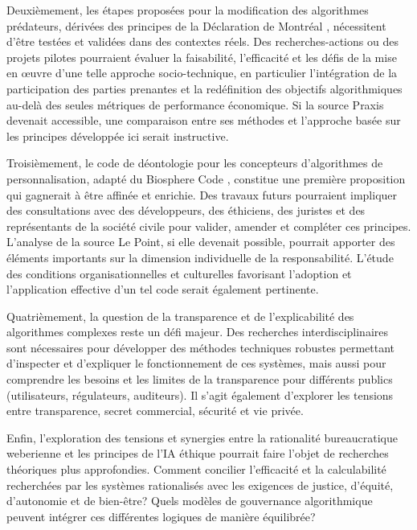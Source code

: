 \documentclass[10pt, twocolumn]{article}
\begin{document}
Deuxièmement, les étapes proposées pour la modification des algorithmes prédateurs, dérivées des principes de la Déclaration de Montréal \citep{Montreal2018}, nécessitent d'être testées et validées dans des contextes réels. Des recherches-actions ou des projets pilotes pourraient évaluer la faisabilité, l'efficacité et les défis de la mise en œuvre d'une telle approche socio-technique, en particulier l'intégration de la participation des parties prenantes et la redéfinition des objectifs algorithmiques au-delà des seules métriques de performance économique. Si la source Praxis devenait accessible, une comparaison entre ses méthodes et l'approche basée sur les principes développée ici serait instructive.

Troisièmement, le code de déontologie pour les concepteurs d'algorithmes de personnalisation, adapté du Biosphere Code \citep{Biosphere2015}, constitue une première proposition qui gagnerait à être affinée et enrichie. Des travaux futurs pourraient impliquer des consultations avec des développeurs, des éthiciens, des juristes et des représentants de la société civile pour valider, amender et compléter ces principes. L'analyse de la source Le Point, si elle devenait possible, pourrait apporter des éléments importants sur la dimension individuelle de la responsabilité. L'étude des conditions organisationnelles et culturelles favorisant l'adoption et l'application effective d'un tel code serait également pertinente.

Quatrièmement, la question de la transparence et de l'explicabilité des algorithmes complexes reste un défi majeur. Des recherches interdisciplinaires sont nécessaires pour développer des méthodes techniques robustes permettant d'inspecter et d'expliquer le fonctionnement de ces systèmes, mais aussi pour comprendre les besoins et les limites de la transparence pour différents publics (utilisateurs, régulateurs, auditeurs). Il s'agit également d'explorer les tensions entre transparence, secret commercial, sécurité et vie privée.

Enfin, l'exploration des tensions et synergies entre la rationalité bureaucratique weberienne \citep{Serpa2019, Weber1922} et les principes de l'IA éthique \citep{Montreal2018} pourrait faire l'objet de recherches théoriques plus approfondies. Comment concilier l'efficacité et la calculabilité recherchées par les systèmes rationalisés avec les exigences de justice, d'équité, d'autonomie et de bien-être? Quels modèles de gouvernance algorithmique peuvent intégrer ces différentes logiques de manière équilibrée?
\end{document}
